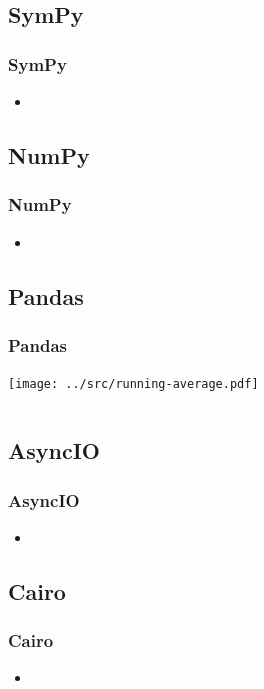 \subsection{SymPy}
\begin{frame}
    \frametitle{SymPy}
    \vspace{5mm}
    
    \begin{itemize}
      \item 
    \end{itemize}
\end{frame}

\subsection{NumPy}
\begin{frame}
    \frametitle{NumPy}
    \vspace{5mm}
    
    \begin{itemize}
      \item 
    \end{itemize}
\end{frame}

\subsection{Pandas}
\begin{frame}
    \frametitle{Pandas}
    \vspace{3mm}
    \hspace{105mm}\texttt{[image: ../src/running-average.pdf]}
    \vspace{-73mm}\inputminted[fontsize=\footnotesize]{python}{../src/pandas-example.py}
\end{frame}

\subsection{AsyncIO}
\begin{frame}
    \frametitle{AsyncIO}
    \vspace{5mm}
    
    \begin{itemize}
      \item 
    \end{itemize}
\end{frame}

\subsection{Cairo}
\begin{frame}
    \frametitle{Cairo}
    \vspace{5mm}
    
    \begin{itemize}
      \item 
    \end{itemize}
\end{frame}

